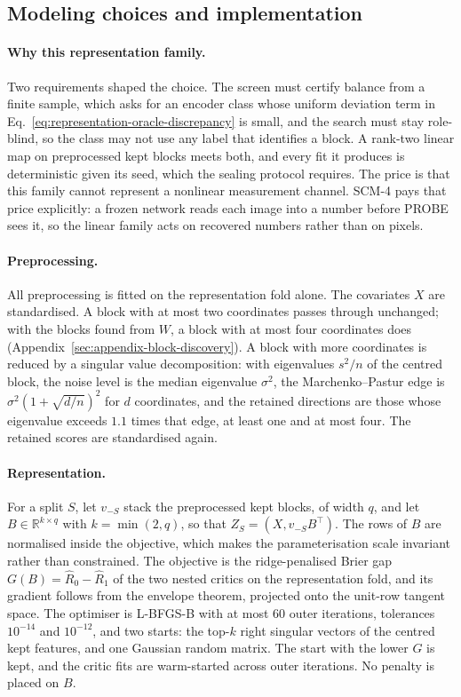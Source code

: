 {%
\subsection{Modeling choices and implementation}
\label{sec:appendix-implementation}

\paragraph{Why this representation family.} Two requirements shaped the choice. The screen must certify balance from a finite sample, which asks for an encoder class whose uniform deviation term in Eq.~\eqref{eq:representation-oracle-discrepancy} is small, and the search must stay role-blind, so the class may not use any label that identifies a block. A rank-two linear map on preprocessed kept blocks meets both, and every fit it produces is deterministic given its seed, which the sealing protocol requires. The price is that this family cannot represent a nonlinear measurement channel. SCM-4 pays that price explicitly: a frozen network reads each image into a number before PROBE sees it, so the linear family acts on recovered numbers rather than on pixels.

\paragraph{Preprocessing.} All preprocessing is fitted on the representation fold alone. The covariates $X$ are standardised. A block with at most two coordinates passes through unchanged; with the blocks found from $W$, a block with at most four coordinates does (Appendix~\ref{sec:appendix-block-discovery}). A block with more coordinates is reduced by a singular value decomposition: with eigenvalues $s^2/n$ of the centred block, the noise level is the median eigenvalue $\sigma^2$, the Marchenko--Pastur edge is $\sigma^2(1+\sqrt{d/n})^2$ for $d$ coordinates, and the retained directions are those whose eigenvalue exceeds $1.1$ times that edge, at least one and at most four. The retained scores are standardised again.

\paragraph{Representation.} For a split $S$, let $v_{-S}$ stack the preprocessed kept blocks, of width $q$, and let $B\in\mathbb R^{k\times q}$ with $k=\min(2,q)$, so that $Z_S=(X,v_{-S}B^{\top})$. The rows of $B$ are normalised inside the objective, which makes the parameterisation scale invariant rather than constrained. The objective is the ridge-penalised Brier gap $G(B)=\widehat R_{0}-\widehat R_{1}$ of the two nested critics on the representation fold, and its gradient follows from the envelope theorem, projected onto the unit-row tangent space. The optimiser is L-BFGS-B with at most $60$ outer iterations, tolerances $10^{-14}$ and $10^{-12}$, and two starts: the top-$k$ right singular vectors of the centred kept features, and one Gaussian random matrix. The start with the lower $G$ is kept, and the critic fits are warm-started across outer iterations. No penalty is placed on $B$.

}
